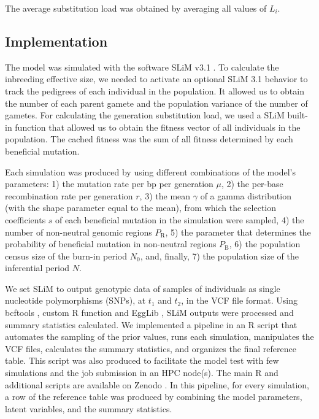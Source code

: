 \documentclass[a4paper, 12pt]{article}
\begin{document}
\noindent The average substitution load was obtained by averaging all values of $L_{i}$.

\subsection*{Implementation}

The model was simulated with the software SLiM v3.1 \citep{Haller:2017gm, Haller:2019fd}. To calculate the inbreeding effective size, we needed to activate an optional SLiM 3.1 behavior to track the pedigrees of each individual in the population. It allowed us to obtain the number of each parent gamete and the population variance of the number of gametes. For calculating the generation substitution load, we used a SLiM built-in function that allowed us to obtain the fitness vector of all individuals in the population. The cached fitness was the sum of all fitness determined by each beneficial mutation. 

Each simulation was produced by using different combinations of the model's parameters: 1) the mutation rate per bp per generation $\mu$, 2) the per-base recombination rate per generation $r$, 3) the mean $\gamma$ of a gamma distribution (with the shape parameter equal to the mean), from which the selection coefficients $s$ of each beneficial mutation in the simulation were sampled, 4) the number of non-neutral genomic regions $P_\mathrm{R}$, 5) the parameter that determines the probability of beneficial mutation in non-neutral regions $P_\mathrm{B}$, 6) the population census size of the burn-in period $N_\mathrm{0}$, and, finally, 7) the population size of the inferential period $N$.

We set SLiM to output genotypic data of samples of individuals as single nucleotide polymorphisms (SNPs), at $t_1$ and $t_2$, in the VCF file format. Using bcftools \citep{Li:2011kr}, custom R function \citep{Rcore} and EggLib \citep{DeMita:2012dx}, SLiM outputs were processed and summary statistics calculated. We implemented a pipeline in an R script that automates the sampling of the prior values, runs each simulation, manipulates the VCF files, calculates the summary statistics, and organizes the final reference table. This script was also produced to facilitate the model test with few simulations and the job submission in an HPC node(s). The main R and additional scripts are available on Zenodo \citep{Pavinato:2021}. In this pipeline, for every simulation, a row of the reference table was produced by combining the model parameters, latent variables, and the summary statistics.
\end{document}
